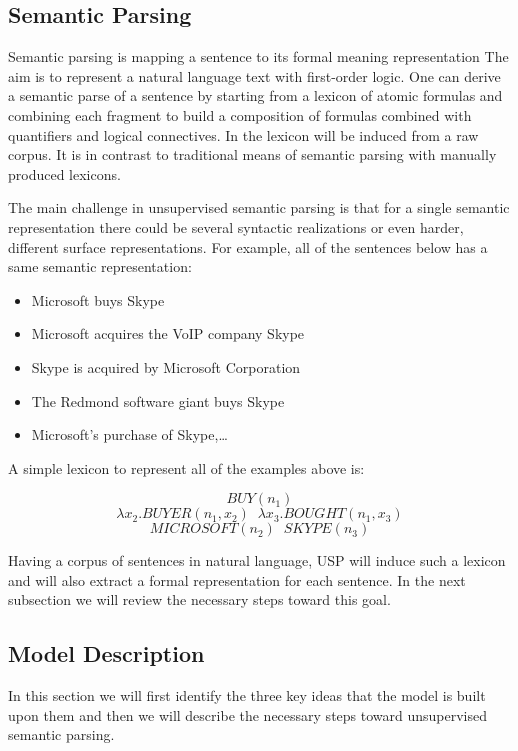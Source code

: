 \documentclass[12pt]{report}
\begin{document}
\subsection{Semantic Parsing}
\label{usp:semantic-parsing}

Semantic parsing is mapping a sentence to its formal meaning representation \cite{Poon2009}
The aim is to represent a natural language text with first-order logic. One can derive a semantic parse of a sentence
by starting from a lexicon of atomic formulas and combining each fragment to build a composition of 
formulas combined with quantifiers and logical connectives. In \cite{Poon2009} 
the lexicon will be induced from a raw corpus. It is in contrast to traditional means of semantic parsing with manually
  produced lexicons.
  
  The main challenge in unsupervised semantic parsing is that for a single semantic representation there could be
  several syntactic realizations or even harder, different surface representations. For example, all of the
   sentences below has a same semantic representation:
   \begin{itemize}
     \item Microsoft buys Skype
     \item Microsoft acquires the VoIP company Skype
     \item Skype is acquired by Microsoft Corporation
     \item The Redmond software giant buys Skype
     \item Microsoft’s purchase of Skype,\ldots
   \end{itemize}  
  
   A simple lexicon to represent all of the examples above is:
  
   $$ BUY(n_1)$$
   $$ \lambda x_2.BUYER(n_1 , x_2) \; \;  \lambda x_3.BOUGHT(n_1 , x_3) $$
   $$ MICROSOFT(n_2) \; \; SKYPE(n_3)$$
   
   Having a corpus of sentences in natural language, USP \cite{Poon2009}
    will induce such a lexicon and will also extract a formal representation for each sentence. In the next 
    subsection we will review the necessary steps toward this goal.
\subsection{Model Description}
\label{ch:model}
In this section we will first identify the three key ideas that the model is built upon them and then 
we will describe the necessary steps toward unsupervised semantic parsing.
\end{document}
